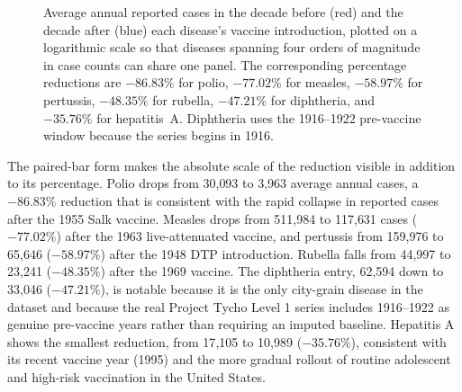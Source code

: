 \documentclass[12pt,a4paper]{article}
\begin{document}
\begin{figure}[H]
\centering
{}
\caption{Average annual reported cases in the decade before (red) and the decade after (blue) each disease's vaccine introduction, plotted on a logarithmic scale so that diseases spanning four orders of magnitude in case counts can share one panel. The corresponding percentage reductions are $-86.83\%$ for polio, $-77.02\%$ for measles, $-58.97\%$ for pertussis, $-48.35\%$ for rubella, $-47.21\%$ for diphtheria, and $-35.76\%$ for hepatitis~A. Diphtheria uses the 1916--1922 pre-vaccine window because the series begins in 1916.}
\label{fig:vaccine_impact}
\end{figure}

The paired-bar form makes the absolute scale of the reduction visible in addition to its percentage. Polio drops from 30{,}093 to 3{,}963 average annual cases, a $-86.83\%$ reduction that is consistent with the rapid collapse in reported cases after the 1955 Salk vaccine. Measles drops from 511{,}984 to 117{,}631 cases ($-77.02\%$) after the 1963 live-attenuated vaccine, and pertussis from 159{,}976 to 65{,}646 ($-58.97\%$) after the 1948 DTP introduction. Rubella falls from 44{,}997 to 23{,}241 ($-48.35\%$) after the 1969 vaccine. The diphtheria entry, 62{,}594 down to 33{,}046 ($-47.21\%$), is notable because it is the only city-grain disease in the dataset and because the real Project Tycho Level 1 series includes 1916--1922 as genuine pre-vaccine years rather than requiring an imputed baseline. Hepatitis A shows the smallest reduction, from 17{,}105 to 10{,}989 ($-35.76\%$), consistent with its recent vaccine year (1995) and the more gradual rollout of routine adolescent and high-risk vaccination in the United States.
\end{document}

